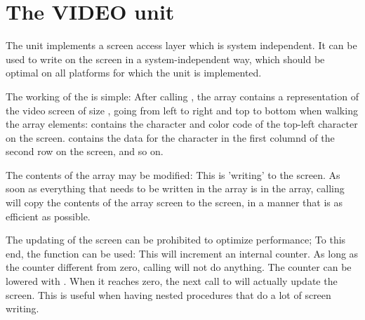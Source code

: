 %
%
%
%
%
%
\chapter{The VIDEO unit}

The  unit implements a screen access layer which is system
independent. It can be used to write on the screen in a system-independent
way, which should be optimal on all platforms for which the unit is
implemented.

The working of the  is simple: After calling ,
the array  contains a representation of the video screen of
size , going from left to right and top to
bottom when walking the array elements:  contains the 
character and color code of the top-left character on the screen.
 contains the data for the character in the
first columnd of the second row on the screen, and so on.

The contents of the  array may be modified: This is 'writing'
to the screen. As soon as everything that needs to be written in the array
is in the  array, calling  will copy the
contents of the array screen to the screen, in a manner that is as efficient
as possible.

The updating of the screen can be prohibited to optimize performance; To
this end, the  function can be used: This will
increment an internal counter. As long as the counter different from zero,
calling  will not do anything. The counter can be
lowered with . When it reaches zero, the next call
to  will actually update the screen. This is useful when
having nested procedures that do a lot of screen writing.

